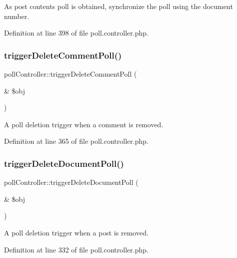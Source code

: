 As post content\textquotesingle{}s poll is obtained, synchronize the poll using the document number. 



Definition at line 398 of file poll.\+controller.\+php.

\hypertarget{classpollController_abd194582f292d00b57a524453ef256d3}{}\label{classpollController_abd194582f292d00b57a524453ef256d3} 
\subsubsection{\texorpdfstring{trigger\+Delete\+Comment\+Poll()}{triggerDeleteCommentPoll()}}
{\footnotesize\ttfamily poll\+Controller\+::trigger\+Delete\+Comment\+Poll (\begin{DoxyParamCaption}\item[{\&}]{\$obj }\end{DoxyParamCaption})}



A poll deletion trigger when a comment is removed. 



Definition at line 365 of file poll.\+controller.\+php.

\hypertarget{classpollController_ac74ea74fb486787ce4c6c3c9fe3a91da}{}\label{classpollController_ac74ea74fb486787ce4c6c3c9fe3a91da} 
\subsubsection{\texorpdfstring{trigger\+Delete\+Document\+Poll()}{triggerDeleteDocumentPoll()}}
{\footnotesize\ttfamily poll\+Controller\+::trigger\+Delete\+Document\+Poll (\begin{DoxyParamCaption}\item[{\&}]{\$obj }\end{DoxyParamCaption})}



A poll deletion trigger when a post is removed. 



Definition at line 332 of file poll.\+controller.\+php.

